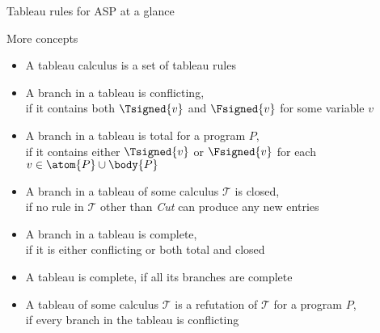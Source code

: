 \begin{frame}[shrink]{Tableau rules for ASP at a glance}
  
\end{frame}
\begin{frame}{More concepts}
  \begin{itemize}
  \item <1-> A \alert{tableau calculus} is a set of tableau rules
  \item <2-> A branch in a tableau is \alert{conflicting},\\
    if it contains both $\Tsigned{v}$ and $\Fsigned{v}$ for some variable $v$
  \item <3-> A branch in a tableau is \alert{total} for a program $P$,\\
    if it contains either $\Tsigned{v}$ or $\Fsigned{v}$ for each $v \in \atom{P} \cup \body{P}$
  \item <4-> A branch in a tableau of some calculus $\mathcal{T}$ is \alert{closed},\\
    if no rule in $\mathcal{T}$ other than \textit{Cut} can produce any new entries
  \item <5-> A branch in a tableau is \alert{complete},\\
    if it is either conflicting or both total and closed
  \item <6-> A tableau is \alert{complete}, if all its branches are complete
  \item <7-> A tableau of some calculus $\mathcal{T}$ is a \alert{refutation} of $\mathcal{T}$ for a program $P$,\\
    if every branch in the tableau is conflicting
  \end{itemize}
\end{frame}
